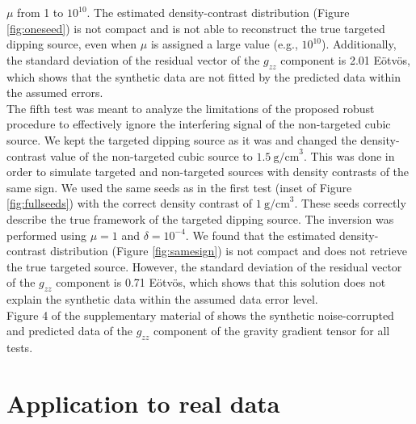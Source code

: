 $\mu$ from 1 to $10^{10}$.
The estimated density-contrast distribution
(Figure \ref{fig:oneseed})
is not compact and is not able to
reconstruct the true targeted dipping source, even when $\mu$ is assigned a
large value (e.g., $10^{10}$).
Additionally,
the standard deviation of the residual vector of the $g_{zz}$ component is
2.01 E\"otv\"os, which shows that
the synthetic data are not fitted by the predicted data
within the assumed errors.
\\ \indent
The fifth test was meant to analyze the limitations of the proposed robust
procedure to effectively ignore the interfering signal of the non-targeted
cubic source.
We kept the targeted dipping source as it was and changed the density-contrast
value of the non-targeted cubic source to $1.5\ \mathrm{g/cm}^3$.
This was done in order to simulate targeted and non-targeted sources with
density contrasts of the same sign.
We used the same seeds as in the first test
(inset of Figure \ref{fig:fullseeds})
with the correct density contrast of $1\ \mathrm{g/cm}^3$.
These seeds correctly describe the true framework of the targeted dipping
source.
The inversion was performed using $\mu=1$ and $\delta=10^{-4}$.
We found that the estimated density-contrast distribution
(Figure \ref{fig:samesign})
is not compact and does not retrieve the true targeted source.
However,
the standard deviation of
the residual vector of the $g_{zz}$ component
is 0.71 E\"otv\"os,
which shows that this solution does not explain
the synthetic data within the assumed data error level.
\\ \indent
Figure 4 of the supplementary material of \citet{Uieda2012b}
shows the synthetic noise-corrupted and predicted data
of the $g_{zz}$ component of the gravity gradient tensor
for all tests.


\section{Application to real data}

